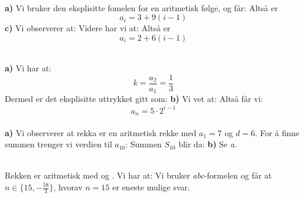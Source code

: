


\usepackage{xr}

\setlength{\parskip}{11pt}

\\
\textbf{a)}
Vi bruker den eksplisitte fomelen for en aritmetisk følge, og får:
Altså er
\[ a_i=3+9(i-1) \]
\textbf{c)}
Vi observerer at:
Videre har vi at:\vs
{}
Altså er
\[ a_i=2+6(i-1) \]



\\
\textbf{a)}
Vi har at:
\[ k=\frac{a_2}{a_1}= \frac{1}{3}\]
Dermed er det eksplisitte uttrykket gitt som:
\textbf{b)}
Vi vet at:
Altså får vi:
\[ a_n = 5\cdot2^{i-1} \]
\newpage
{}\\
\textbf{a)} Vi observerer at rekka er en aritmetisk rekke med $ a_1= 7$ og $ d= 6$. For å finne summen trenger vi verdien til $ a_{10} $:
Summen $ S_{10} $ blir da:
\textbf{b)} Se \textsl{a}.

 \\
Rekken er aritmetisk med  og . Vi har at:
Vi bruker \textit{abc}-formelen og får at $ {n\in\lbrace15, -\frac{58}{3}\rbrace} $, hvorav $ {n=15} $ er eneste mulige svar. 

